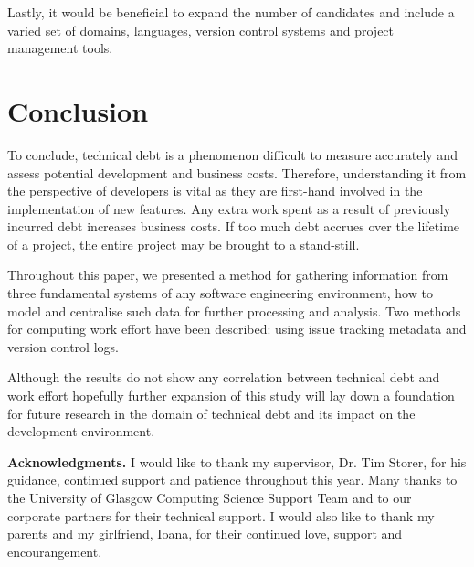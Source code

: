 \documentclass{mpaper}
\begin{document}
Lastly, it would be beneficial to expand the number of candidates and include a
varied set of domains, languages, version control systems and project management
tools.

\section{Conclusion}
\label{conclusion}

To conclude, technical debt is a phenomenon difficult to measure accurately and
assess potential development and business costs. Therefore, understanding it
from the perspective of developers is vital as they are first-hand involved in
the implementation of new features. Any extra work spent as a result of
previously incurred debt increases business costs. If too much debt accrues over
the lifetime of a project, the entire project may be brought to a stand-still.

Throughout this paper, we presented a method for gathering information from
three fundamental systems of any software engineering environment, how to model
and centralise such data for further processing and analysis. Two methods for
computing work effort have been described: using issue tracking metadata and
version control logs. 

Although the results do not show any correlation between technical debt and work
effort hopefully further expansion of this study will lay down a foundation for
future research in the domain of technical debt and its impact on the
development environment.

{\bf Acknowledgments.} I would like to thank my supervisor, Dr. Tim Storer, for
his guidance, continued support and patience throughout this year. Many thanks
to the University of Glasgow Computing Science Support Team and to our corporate
partners for their technical support. I would also like to thank my parents and
my girlfriend, Ioana, for their continued love, support and encourangement. 



\end{document}
